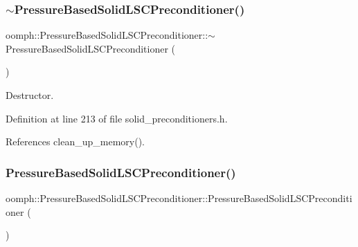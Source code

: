 \subsubsection{\texorpdfstring{$\sim$\+Pressure\+Based\+Solid\+L\+S\+C\+Preconditioner()}{~PressureBasedSolidLSCPreconditioner()}}
{\footnotesize\ttfamily oomph\+::\+Pressure\+Based\+Solid\+L\+S\+C\+Preconditioner\+::$\sim$\+Pressure\+Based\+Solid\+L\+S\+C\+Preconditioner (\begin{DoxyParamCaption}{ }\end{DoxyParamCaption})\hspace{0.3cm}{\ttfamily [inline]}}



Destructor. 



Definition at line 213 of file solid\+\_\+preconditioners.\+h.



References clean\+\_\+up\+\_\+memory().

\mbox{\label{classoomph_1_1PressureBasedSolidLSCPreconditioner_a29d5b33a278a9ac3d868646553db949a}} 
\subsubsection{\texorpdfstring{Pressure\+Based\+Solid\+L\+S\+C\+Preconditioner()}{PressureBasedSolidLSCPreconditioner()}\hspace{0.1cm}{\footnotesize\ttfamily [2/2]}}
{\footnotesize\ttfamily oomph\+::\+Pressure\+Based\+Solid\+L\+S\+C\+Preconditioner\+::\+Pressure\+Based\+Solid\+L\+S\+C\+Preconditioner (\begin{DoxyParamCaption}\item[{const \hyperlink{classoomph_1_1PressureBasedSolidLSCPreconditioner}{Pressure\+Based\+Solid\+L\+S\+C\+Preconditioner} \&}]{ }\end{DoxyParamCaption})\hspace{0.3cm}{\ttfamily [inline]}}



